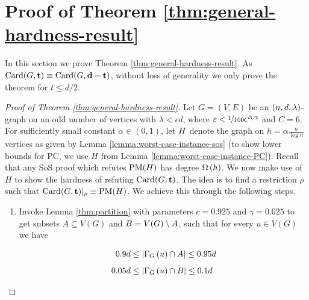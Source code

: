 \documentclass[11pt]{article}
\begin{document}
\section{Proof of Theorem \ref{thm:general-hardness-result}}
\label{sec:main-proof}

In this section we prove Theorem \ref{thm:general-hardness-result}. As $\Card{G, \vec{t}} \equiv \Card{G, \vec{d-t}}$, without loss of generality we only prove the theorem for $t \le d/2$. 

\begin{proof}[Proof of Theorem \ref{thm:general-hardness-result}]
Let $G=(V,E)$ be an $\EnDeeLambda$-graph on an odd number of vertices with $\lambda < \epsilon d$, where $\epsilon < \nicefrac{1}{100C^{3/2}}$ and $C=6$. 
For sufficiently small constant $\alpha \in (0,1)$, let $\HardInstance$ denote the graph on $h=\alpha\frac{n}{\log n}$ vertices as given by Lemma \ref{lemma:worst-case-instance-sos} (to show lower bounds for PC, we use $H$ from Lemma \ref{lemma:worst-case-instance-PC}). Recall that any SoS proof which refutes $\PM{H}$ has degree $\BigOmega{h}$. We now make use of $H$ to show the hardness of refuting $\Card{G, \vec{t}}$. The idea is to find a restriction $\rho$ such that $\Card{G, \vec{t}}|_\rho \equiv \PM{H}$. We achieve this through the following steps.

\begin{enumerate}
\item{Invoke Lemma  \ref{thm:partition} with parameters $c=0.925$ and $\gamma = 0.025$ to get subsets $A \subseteq V(G)$ and $B = \Vertices{G} \setminus A$, such that for every $u \in V(G)$ we have
    
\begin{align} 
0.9d  &\leq   \Size{\Neighbourhood{G}{u} \cap \RedA} \leq 0.95d \label{eq:size_nbr_A}\\[5pt]
0.05d  &\leq   \Size{\Neighbourhood{G}{u} \cap \GreenB} \leq 0.1d 
\label{eq:size_nbr_B}
\end{align}
}


\end{enumerate}
\end{proof}
\end{document}
